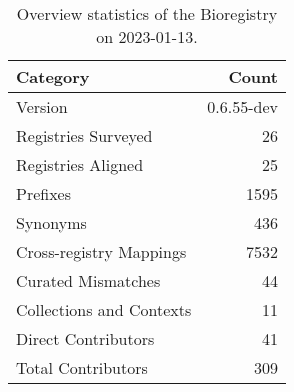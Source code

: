 \begin{table}
\centering
\caption{Overview statistics of the Bioregistry on 2023-01-13.}
\label{tab:bioregistry-summary}
\begin{tabular}{lr}
\toprule
                Category &      Count \\
\midrule
                 Version & 0.6.55-dev \\
     Registries Surveyed &         26 \\
      Registries Aligned &         25 \\
                Prefixes &       1595 \\
                Synonyms &        436 \\
 Cross-registry Mappings &       7532 \\
      Curated Mismatches &         44 \\
Collections and Contexts &         11 \\
     Direct Contributors &         41 \\
      Total Contributors &        309 \\
\bottomrule
\end{tabular}
\end{table}
